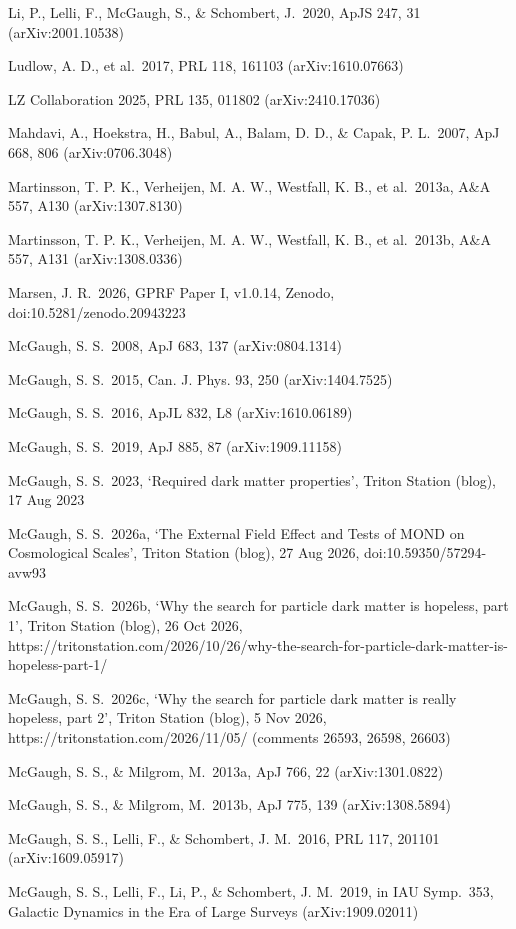 \documentclass[
  10pt,
]{article}
\begin{document}
{\begin{list}{}{\setlength{\leftmargin}{1.5em}\setlength{\itemindent}{-1.5em}\setlength{\itemsep}{1pt}\setlength{\parsep}{0pt}}
\item Li, P., Lelli, F., McGaugh, S., \& Schombert, J.\ 2020, ApJS 247, 31 (arXiv:2001.10538)
\item Ludlow, A. D., et al.\ 2017, PRL 118, 161103 (arXiv:1610.07663)
\item LZ Collaboration 2025, PRL 135, 011802 (arXiv:2410.17036)
\item Mahdavi, A., Hoekstra, H., Babul, A., Balam, D. D., \& Capak, P. L.\ 2007, ApJ 668, 806 (arXiv:0706.3048)
\item Martinsson, T. P. K., Verheijen, M. A. W., Westfall, K. B., et al.\ 2013a, A\&A 557, A130 (arXiv:1307.8130)
\item Martinsson, T. P. K., Verheijen, M. A. W., Westfall, K. B., et al.\ 2013b, A\&A 557, A131 (arXiv:1308.0336)
\item Marsen, J. R.\ 2026, GPRF Paper I, v1.0.14, Zenodo, doi:10.5281/zenodo.20943223
\item McGaugh, S. S.\ 2008, ApJ 683, 137 (arXiv:0804.1314)
\item McGaugh, S. S.\ 2015, Can. J. Phys. 93, 250 (arXiv:1404.7525)
\item McGaugh, S. S.\ 2016, ApJL 832, L8 (arXiv:1610.06189)
\item McGaugh, S. S.\ 2019, ApJ 885, 87 (arXiv:1909.11158)
\item McGaugh, S. S.\ 2023, `Required dark matter properties', Triton Station (blog), 17 Aug 2023
\item McGaugh, S. S.\ 2026a, `The External Field Effect and Tests of MOND on Cosmological Scales', Triton Station (blog), 27 Aug 2026, doi:10.59350/57294-avw93
\item McGaugh, S. S.\ 2026b, `Why the search for particle dark matter is hopeless, part 1', Triton Station (blog), 26 Oct 2026, https://tritonstation.com/2026/10/26/why-the-search-for-particle-dark-matter-is-hopeless-part-1/
\item McGaugh, S. S.\ 2026c, `Why the search for particle dark matter is really hopeless, part 2', Triton Station (blog), 5 Nov 2026, https://tritonstation.com/2026/11/05/ (comments 26593, 26598, 26603)
\item McGaugh, S. S., \& Milgrom, M.\ 2013a, ApJ 766, 22 (arXiv:1301.0822)
\item McGaugh, S. S., \& Milgrom, M.\ 2013b, ApJ 775, 139 (arXiv:1308.5894)
\item McGaugh, S. S., Lelli, F., \& Schombert, J. M.\ 2016, PRL 117, 201101 (arXiv:1609.05917)
\item McGaugh, S. S., Lelli, F., Li, P., \& Schombert, J. M.\ 2019, in IAU Symp.~353, Galactic Dynamics in the Era of Large Surveys (arXiv:1909.02011)

\end{list}}
\end{document}
